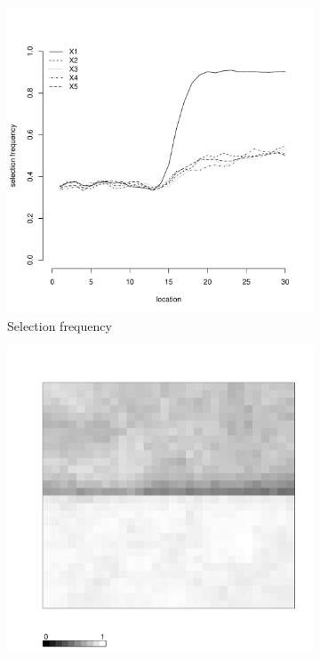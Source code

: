\documentclass[authoryear, review, 11pt]{elsarticle}
\begin{document}
\begin{figure}
\begin{subfigure}[b]{0.45\textwidth}
		\includegraphics[width=\textwidth]{../../figures/simulation/15.15.profile_selection.pdf}
		\caption{Selection frequency}
	\end{subfigure}
	\begin{subfigure}[b]{0.45\textwidth}
	\centering
		\includegraphics[width=\textwidth]{../../figures/simulation/X1.15.15.unshrunk_bootstrap_coverage.pdf}

\end{subfigure}
\end{figure}
\end{document}
